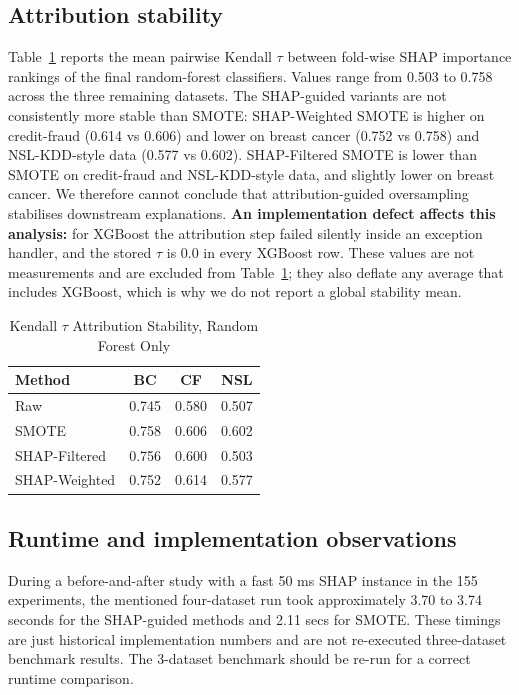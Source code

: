 \documentclass[conference]{IEEEtran}
\begin{document}
\subsection{Attribution stability}
Table~\ref{tab:tau} reports the mean pairwise Kendall $\tau$ between fold-wise SHAP importance rankings of the final random-forest classifiers. Values range from 0.503 to 0.758 across the three remaining datasets. The SHAP-guided variants are not consistently more stable than SMOTE: SHAP-Weighted SMOTE is higher on credit-fraud (0.614 vs 0.606) and lower on breast cancer (0.752 vs 0.758) and NSL-KDD-style data (0.577 vs 0.602). SHAP-Filtered SMOTE is lower than SMOTE on credit-fraud and NSL-KDD-style data, and slightly lower on breast cancer. We therefore cannot conclude that attribution-guided oversampling stabilises downstream explanations. \textbf{An implementation defect affects this analysis:} for XGBoost the attribution step failed silently inside an exception handler, and the stored $\tau$ is 0.0 in every XGBoost row. These values are not measurements and are excluded from Table~\ref{tab:tau}; they also deflate any average that includes XGBoost, which is why we do not report a global stability mean.

\begin{table}[t]
\caption{Kendall $\tau$ Attribution Stability, Random Forest Only}
\label{tab:tau}
\centering
\small
\begin{tabular}{lccc}
\toprule
\textbf{Method} & \textbf{BC} & \textbf{CF} & \textbf{NSL} \\
\midrule
Raw & 0.745 & 0.580 & 0.507 \\
SMOTE & 0.758 & 0.606 & 0.602 \\
SHAP-Filtered & 0.756 & 0.600 & 0.503 \\
SHAP-Weighted & 0.752 & 0.614 & 0.577 \\
\bottomrule
\end{tabular}
\end{table}

\subsection{Runtime and implementation observations}
During a before-and-after study with a fast 50 ms SHAP instance in the 155 experiments, the mentioned four-dataset run took approximately 3.70 to 3.74 seconds for the SHAP-guided methods and 2.11 secs for SMOTE. These timings are just historical implementation numbers and are not re-executed three-dataset benchmark results. The 3-dataset benchmark should be re-run for a correct runtime comparison.
\end{document}
